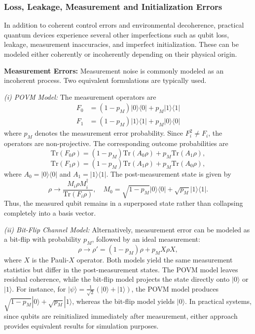 \documentclass[conference]{IEEEtran}
\begin{document}
\vspace{4pt}
\subsubsection{Loss, Leakage, Measurement and Initialization Errors}

In addition to coherent control errors and environmental decoherence, practical quantum devices experience several other imperfections such as qubit loss, leakage, measurement inaccuracies, and imperfect initialization. These can be modeled either coherently or incoherently depending on their physical origin.

\textbf{Measurement Errors:} Measurement noise is commonly modeled as an incoherent process. Two equivalent formulations are typically used.

\textit{(i) POVM Model:} The measurement operators are
\begin{equation}
        \begin{aligned}
            F_0 &= (1-p_M)|0\rangle\langle 0| + p_M |1\rangle\langle 1| \\
            F_1 &= (1-p_M)|1\rangle\langle 1| + p_M |0\rangle\langle 0|
        \end{aligned}
\end{equation}
where $p_M$ denotes the measurement error probability. Since $F_i^2 \neq F_i$, the operators are non-projective. The corresponding outcome probabilities are
\begin{equation}
\mathrm{Tr}(F_0\rho) = (1-p_M)\mathrm{Tr}(A_0\rho) + p_M \mathrm{Tr}(A_1\rho),
\end{equation}
\begin{equation}
\mathrm{Tr}(F_1\rho) = (1-p_M)\mathrm{Tr}(A_1\rho) + p_M \mathrm{Tr}(A_0\rho),
\end{equation}
where $A_0 = |0\rangle\langle 0|$ and $A_1 = |1\rangle\langle 1|$.  
The post-measurement state is given by
\begin{equation}
\rho \rightarrow \frac{M_i \rho M_i^\dagger}{\mathrm{Tr}(F_i\rho)}, \quad
M_0 = \sqrt{1-p_M}|0\rangle\langle 0| + \sqrt{p_M}|1\rangle\langle 1|.
\end{equation}
Thus, the measured qubit remains in a superposed state rather than collapsing completely into a basis vector.

\textit{(ii) Bit-Flip Channel Model:} Alternatively, measurement error can be modeled as a bit-flip with probability $p_M$, followed by an ideal measurement:
\begin{equation}
\rho \rightarrow \rho' = (1-p_M)\rho + p_M X\rho X,
\end{equation}
where $X$ is the Pauli-$X$ operator. Both models yield the same measurement statistics but differ in the post-measurement states. The POVM model leaves residual coherence, while the bit-flip model projects the state directly onto $|0\rangle$ or $|1\rangle$.  
For instance, for $|\psi\rangle = \tfrac{1}{\sqrt{2}}(|0\rangle + |1\rangle)$, the POVM model produces $\sqrt{1-p_M}|0\rangle + \sqrt{p_M}|1\rangle$, whereas the bit-flip model yields $|0\rangle$.  
In practical systems, since qubits are reinitialized immediately after measurement, either approach provides equivalent results for simulation purposes.
\end{document}
